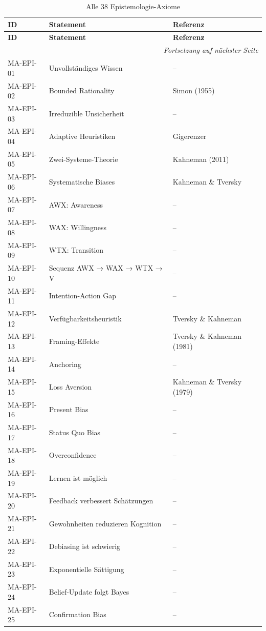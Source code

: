 \begin{longtable}{@{}lll@{}}
\caption{Alle 38 Epistemologie-Axiome} \\
\toprule
\textbf{ID} & \textbf{Statement} & \textbf{Referenz} \\
\midrule
\endfirsthead
\toprule
\textbf{ID} & \textbf{Statement} & \textbf{Referenz} \\
\midrule
\endhead
\midrule
\multicolumn{3}{r}{\textit{Fortsetzung auf nächster Seite}} \\
\endfoot
\bottomrule
\endlastfoot
MA-EPI-01 & Unvollständiges Wissen & -- \\
MA-EPI-02 & Bounded Rationality & Simon (1955) \\
MA-EPI-03 & Irreduzible Unsicherheit & -- \\
MA-EPI-04 & Adaptive Heuristiken & Gigerenzer \\
MA-EPI-05 & Zwei-Systeme-Theorie & Kahneman (2011) \\
MA-EPI-06 & Systematische Biases & Kahneman \& Tversky \\
MA-EPI-07 & AWX: Awareness & -- \\
MA-EPI-08 & WAX: Willingness & -- \\
MA-EPI-09 & WTX: Transition & -- \\
MA-EPI-10 & Sequenz AWX → WAX → WTX → V & -- \\
MA-EPI-11 & Intention-Action Gap & -- \\
MA-EPI-12 & Verfügbarkeitsheuristik & Tversky \& Kahneman \\
MA-EPI-13 & Framing-Effekte & Tversky \& Kahneman (1981) \\
MA-EPI-14 & Anchoring & -- \\
MA-EPI-15 & Loss Aversion & Kahneman \& Tversky (1979) \\
MA-EPI-16 & Present Bias & -- \\
MA-EPI-17 & Status Quo Bias & -- \\
MA-EPI-18 & Overconfidence & -- \\
MA-EPI-19 & Lernen ist möglich & -- \\
MA-EPI-20 & Feedback verbessert Schätzungen & -- \\
MA-EPI-21 & Gewohnheiten reduzieren Kognition & -- \\
MA-EPI-22 & Debiasing ist schwierig & -- \\
MA-EPI-23 & Exponentielle Sättigung & -- \\
MA-EPI-24 & Belief-Update folgt Bayes & -- \\
MA-EPI-25 & Confirmation Bias & -- \\

\end{longtable}
